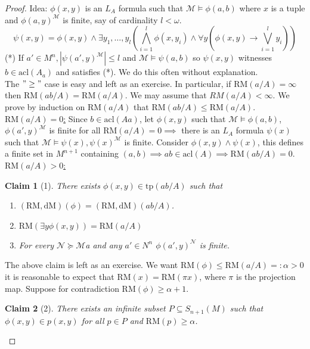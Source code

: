 \documentclass[letterpaper, 12pt]{article}
\newcommand{\cM}{\mathcal{M}}
\newcommand{\cN}{\mathcal{N}}
\newcommand{\tp}{\mbox{tp}}
\newcommand{\RM}{\mbox{RM}}
\newcommand{\dM}{\mbox{dM}}
\newcommand{\acl}{\mbox{acl}}
\theoremstyle{stdthm}
\theoremstyle{stddef}
\theoremstyle{stdnonum}
\newtheorem{claim}{Claim}
\theoremstyle{stdqands}
\theoremstyle{stdbold}
\begin{document}
\begin{proof}
Idea: $\phi(x,y)$ is an $L_A$ formula such that $\cM \models \phi(a,b)$ where $x$ is a tuple and $\phi(a,y)^\cM$ is finite, say of cardinality $l < \omega$. 
\[\psi(x,y) = \phi(x,y) \wedge \exists y_1,\dots,y_l \left( \bigwedge_{i=1}^l \phi(x,y_i) \wedge \forall y( \phi(x,y) \to \bigvee_{i=1}^l y_i)\right) \] 
(*) If $a' \in M^n, |\psi(a',y)^\cM| \leq l$ and $\cM \models \psi(a,b)$ so $\psi(x,y)$ witnesses $b \in \acl(A_a)$ and satisfies (*). We do this often without explanation. \\

The $"\geq"$ case is easy and left as an exercise. In particular, if $\RM(a/A) = \infty$ then $\RM(ab/A) = \RM(a/A)$. We may assume that $RM(a/A) < \infty$. We prove by induction on $\RM(a/A)$ that $\RM(ab/A) \leq \RM(a/A)$. \\

\underline{$\RM(a/A) = 0 $:} Since $b \in \acl(Aa)$, let $\phi(x,y)$ such that $\cM \models \phi(a,b)$, $\phi(a',y)^\cM$ is finite for all $\RM(a/A) = 0 \implies$ there is an $L_A$ formula $\psi(x)$ such that $\cM \models \psi(x), \psi(x)^\cM$ is finite. Consider $\phi(x,y) \wedge \psi(x)$, this defines a finite set in $M^{n+1}$ containing $(a,b) \implies ab \in \acl(A) \implies \RM(ab/A) = 0$. \\

\underline{$\RM(a/A) > 0$:}

\begin{claim}[1]
There exists $\phi(x,y) \in \tp(ab/A)$ such that 
\begin{enumerate}
\item $(\RM,\dM)(\phi) = (\RM, \dM)(ab/A)$. 
\item $\RM(\exists y \phi(x,y)) = \RM(a/A)$ 
\item For every $\cN \succeq \cM$a and any $a' \in N^n$ $\phi(a',y)^\cN$ is finite. 
\end{enumerate}

\end{claim}
The above claim is left as an exercise. We want $\RM(\phi) \leq \RM(a/A) =: \alpha > 0$ it is reasonable to expect that $\RM(x) = \RM(\pi x)$, where $\pi$ is the projection map. Suppose for contradiction $\RM(\phi) \geq \alpha +1$. 

\begin{claim}[2]
There exists an infinite subset $P \subseteq S_{n+1}(M)$ such that $\phi(x,y) \in p(x,y)$ for all $p \in P$ and $\RM(p) \geq \alpha$. 
\end{claim}


\end{proof}
\end{document}
